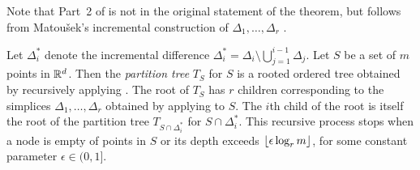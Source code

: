 \documentclass{patmorin}
\newcommand{\eps}{\epsilon}
\begin{document}
Note that Part~2 of  is not in the original
statement of the theorem, but follows from Matou\v{s}ek's incremental
construction of $\Delta_1,\ldots,\Delta_r$ \cite{m92}.

%
%
%

Let $\Delta_i^*$ denote the incremental difference
$\Delta_i^*=\Delta_i\setminus\bigcup_{j=1}^{i-1}\Delta_j$.  Let $S$
be a set of $m$ points in $\mathbb{R}^d$. Then the \emph{partition tree}
$T_S$ for $S$ is a rooted ordered tree obtained by recursively
applying .  The root of $T_S$ has $r$ children
corresponding to the simplices $\Delta_1,\ldots,\Delta_{r}$ obtained
by applying  to $S$.  The $i$th child of the
root is itself the root of the partition tree $T_{S\cap\Delta_i^*}$
for $S\cap\Delta_i^*$. This recursive process stops when a node is
empty of points in $S$ or its depth exceeds $\floor{\eps\log_r m}$,
for some constant parameter $\epsilon\in(0,1]$.
\end{document}
